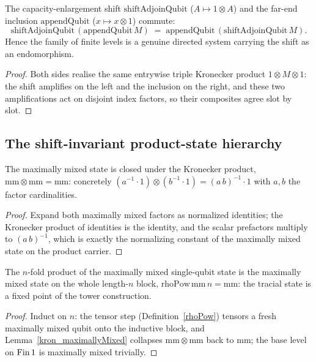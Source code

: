 \begin{theorem}\label{shiftAdjoinQubit_appendQubit}
  \leanok
  The capacity-enlargement shift \(\mathrm{shiftAdjoinQubit}\) (\(A\mapsto 1\otimes A\)) and the
  far-end inclusion \(\mathrm{appendQubit}\) (\(x\mapsto x\otimes 1\)) commute:
  \[
    \mathrm{shiftAdjoinQubit}\,(\mathrm{appendQubit}\,M)
      \;=\; \mathrm{appendQubit}\,(\mathrm{shiftAdjoinQubit}\,M).
  \]
  Hence the family of finite levels is a genuine directed system carrying the shift as an
  endomorphism.
\end{theorem}
\begin{proof}\leanok
  Both sides realise the same entrywise triple Kronecker product \(1\otimes M\otimes 1\): the shift
  amplifies on the left and the inclusion on the right, and these two amplifications act on disjoint
  index factors, so their composites agree slot by slot.
\end{proof}

\subsection{The shift-invariant product-state hierarchy}

\begin{lemma}\label{kron_maximallyMixed}
  \leanok
  The maximally mixed state is closed under the Kronecker product,
  \(\mathrm{mm}\otimes\mathrm{mm}=\mathrm{mm}\): concretely
  \((a^{-1}\cdot 1)\otimes(b^{-1}\cdot 1)=(a\,b)^{-1}\cdot 1\) with \(a,b\) the factor cardinalities.
\end{lemma}
\begin{proof}\leanok
  Expand both maximally mixed factors as normalized identities; the Kronecker product of identities is
  the identity, and the scalar prefactors multiply to \((a\,b)^{-1}\), which is exactly the normalizing
  constant of the maximally mixed state on the product carrier.
\end{proof}

\begin{theorem}\label{rhoPow_maximallyMixed}
  \leanok
  The \(n\)-fold product of the maximally mixed single-qubit state is the maximally mixed state on the
  whole length-\(n\) block, \(\mathrm{rhoPow}\,\mathrm{mm}\,n=\mathrm{mm}\): the tracial state is a
  fixed point of the tower construction.
\end{theorem}
\begin{proof}\leanok
  Induct on \(n\): the tensor step (Definition~\ref{rhoPow}) tensors a fresh maximally mixed qubit onto
  the inductive block, and Lemma~\ref{kron_maximallyMixed} collapses \(\mathrm{mm}\otimes\mathrm{mm}\)
  back to \(\mathrm{mm}\); the base level on \(\operatorname{Fin} 1\) is maximally mixed trivially.
\end{proof}

